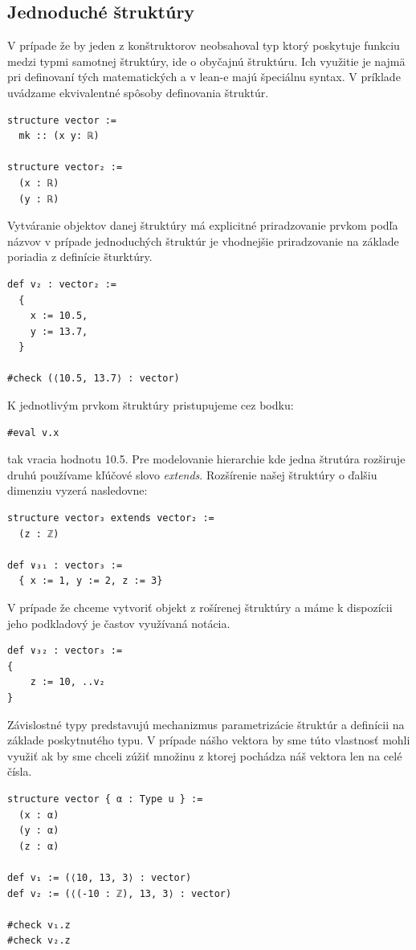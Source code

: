 \documentclass[a4paper,10pt,oneside]{report}%
\begin{document}
\subsection{Jednoduché štruktúry}
    V prípade že by jeden z konštruktorov neobsahoval typ ktorý poskytuje funkciu
medzi typmi samotnej štruktúry, ide o obyčajnú štruktúru.
    Ich využitie je najmä pri definovaní tých matematických a v lean-e majú
špeciálnu syntax.
    V príklade uvádzame ekvivalentné spôsoby definovania štruktúr.
\begin{lstlisting}
structure vector :=
  mk :: (x y: ℝ)

structure vector₂ :=
  (x : ℝ)
  (y : ℝ)
\end{lstlisting}
    Vytváranie objektov danej štruktúry má explicitné priradzovanie prvkom
podľa názvov v prípade jednoduchých štruktúr je vhodnejšie priradzovanie na
základe poriadia z definície šturktúry.
\begin{lstlisting}
def v₂ : vector₂ :=
  {
    x := 10.5,
    y := 13.7,
  }

#check (⟨10.5, 13.7⟩ : vector)
\end{lstlisting}
    K jednotlivým prvkom štruktúry pristupujeme cez bodku:
\begin{lstlisting}
#eval v.x
\end{lstlisting}
    tak vracia hodnotu 10.5.
    Pre modelovanie hierarchie kde jedna štrutúra rozširuje druhú používame
kľúčové slovo \emph{extends}.
    Rozšírenie našej štruktúry o ďalšiu dimenziu vyzerá nasledovne:
\begin{lstlisting}
structure vector₃ extends vector₂ :=
  (z : ℤ)

def ∨₃₁ : vector₃ :=
  { x := 1, y := 2, z := 3}
\end{lstlisting}
    V prípade že chceme vytvoriť objekt z rošírenej štruktúry a máme k dispozícii
jeho podkladový je častov využívaná notácia.
\begin{lstlisting}
def ∨₃₂ : vector₃ :=
{
    z := 10, ..v₂
}
\end{lstlisting}
    Závislostné typy predstavujú mechanizmus parametrizácie štruktúr a definícii
na základe poskytnutého typu.
    V prípade nášho vektora by sme túto vlastnosť mohli využiť ak by sme chceli
zúžiť množinu z ktorej pochádza náš vektora len na celé čísla.
\begin{lstlisting}
structure vector { α : Type u } :=
  (x : α)
  (y : α)
  (z : α)

def v₁ := (⟨10, 13, 3⟩ : vector)
def v₂ := (⟨(-10 : ℤ), 13, 3⟩ : vector)

#check v₁.z
#check v₂.z
\end{lstlisting}
\end{document}
